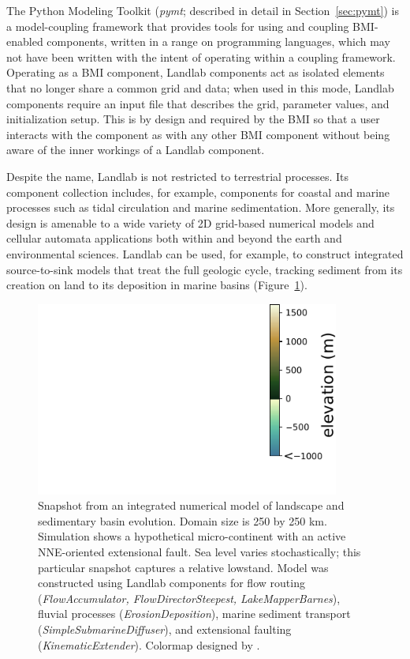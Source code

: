 \documentclass[12pt]{amsart}
\begin{document}
The Python Modeling Toolkit (\textit{pymt}; described in detail in Section~\ref{sec:pymt})
is a model-coupling framework that provides tools for using and coupling BMI-enabled components,
written in a range on programming languages, which may not have been written with the intent
of operating within a coupling framework.
Operating as a BMI component, Landlab components act as isolated elements that no longer
share a common grid and data; when used in this mode, Landlab components require an input file that describes the grid, parameter values, and
initialization setup. This is by design and required by the BMI so that a user interacts
with the component as with any other BMI component without being aware of the inner workings
of a Landlab component.


Despite the name, Landlab is not restricted to terrestrial processes. Its component collection includes, for example, components for coastal and marine processes such as tidal circulation and marine sedimentation. More generally, its design is amenable to a wide variety of 2D grid-based numerical models and cellular automata applications both within and beyond the earth and environmental sciences. Landlab can be used, for example, to construct integrated source-to-sink models that treat the full geologic cycle, tracking sediment from its creation on land to its deposition in marine basins (Figure~\ref{fig:riftisland}).

\begin{figure}
\includegraphics[width=10cm]{Figures/rift_island.pdf}
\caption{Snapshot from an integrated numerical model of landscape and sedimentary basin evolution. Domain size is 250 by 250 km. Simulation shows a hypothetical micro-continent with an active NNE-oriented extensional fault. Sea level varies stochastically; this particular snapshot captures a relative lowstand. Model was constructed using Landlab components for flow routing (\textit{FlowAccumulator, FlowDirectorSteepest, LakeMapperBarnes}), fluvial processes (\textit{ErosionDeposition}), marine sediment transport (\textit{SimpleSubmarineDiffuser}), and extensional faulting (\textit{KinematicExtender}). Colormap designed by \citet{thyng2016true}.}
\label{fig:riftisland}
\end{figure}
\end{document}
